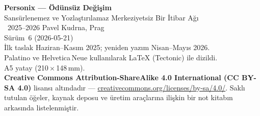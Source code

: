 \thispagestyle{empty}
\ifdefined\printmode\vspace*{\fill}\else{}\fi
\begin{flushleft}\small\sffamily
\textbf{Personix --- Ödünsüz Değişim}\\[0.3em]
Sansürlenemez ve Yozlaştırılamaz Merkeziyetsiz Bir İtibar Ağı\\[1.4em]

\textcopyright\ 2025--2026 Pavel Kudrna, Prag\\[0.4em]

Sürüm~6 (2026-05-21)\\
İlk taslak Haziran--Kasım 2025; yeniden yazım Nisan--Mayıs 2026.\\[1.4em]

Palatino ve Helvetica\,Neue kullanılarak \LaTeX{} (Tectonic) ile dizildi.\\
A5 yatay (210\,$\times$\,148\,mm).\\[1.4em]

\textbf{Creative Commons Attribution-ShareAlike 4.0
International (CC BY-SA 4.0)} lisansı altındadır ---
\href{https://creativecommons.org/licenses/by-sa/4.0/}{creativecommons.org/licenses/by-sa/4.0/}.
Saklı tutulan öğeler, kaynak deposu ve üretim araçlarına ilişkin bir not
kitabın arkasında listelenmiştir.
\end{flushleft}
\ifdefined\printmode\else{}\fi
\clearpage
